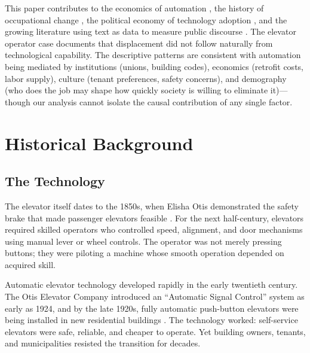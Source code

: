 \documentclass[12pt]{article}
\begin{document}
This paper contributes to the economics of automation \citep{acemoglu2020, autor2003, frey2017}, the history of occupational change \citep{goldinkatz2008, derenoncourt2022, abramitzky2021}, the political economy of technology adoption \citep{mokyr1992, david1990, comin2010}, and the growing literature using text as data to measure public discourse \citep{gentzkow2019, dell2023}. The elevator operator case documents that displacement did not follow naturally from technological capability. The descriptive patterns are consistent with automation being mediated by institutions (unions, building codes), economics (retrofit costs, labor supply), culture (tenant preferences, safety concerns), and demography (who does the job may shape how quickly society is willing to eliminate it)---though our analysis cannot isolate the causal contribution of any single factor.




\section{Historical Background} \label{sec:background}

\subsection{The Technology}

The elevator itself dates to the 1850s, when Elisha Otis demonstrated the safety brake that made passenger elevators feasible \citep{goodwin2005}. For the next half-century, elevators required skilled operators who controlled speed, alignment, and door mechanisms using manual lever or wheel controls. The operator was not merely pressing buttons; they were piloting a machine whose smooth operation depended on acquired skill.

Automatic elevator technology developed rapidly in the early twentieth century. The Otis Elevator Company introduced an ``Automatic Signal Control'' system as early as 1924, and by the late 1920s, fully automatic push-button elevators were being installed in new residential buildings \citep{goodwin2005}. The technology worked: self-service elevators were safe, reliable, and cheaper to operate. Yet building owners, tenants, and municipalities resisted the transition for decades.
\end{document}
